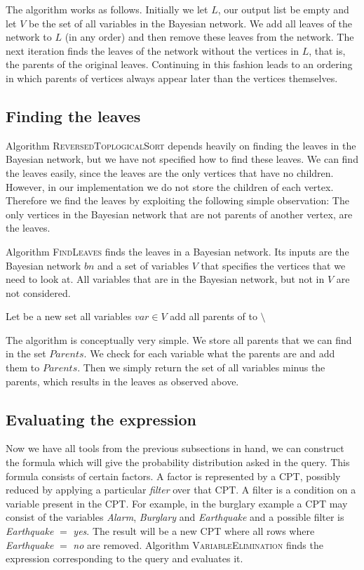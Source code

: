 \documentclass[10pt,a4paper]{article}
\begin{document}
The algorithm works as follows. Initially we let $L$, our output list be empty and let $V$ be the set of all variables in the Bayesian network. We add all leaves of the network to $L$ (in any order) and then remove these leaves from the network. The next iteration finds the leaves of the network without the vertices in $L$, that is, the parents of the original leaves. Continuing in this fashion leads to an ordering in which parents of vertices always appear later than the vertices themselves.

\subsection{Finding the leaves}
Algorithm \textsc{ReversedToplogicalSort} depends heavily on finding the leaves in the Bayesian network, but we have not specified how to find these leaves. We can find the leaves easily, since the leaves are the only vertices that have no children. However, in our implementation we do not store the children of each vertex. Therefore we find the leaves by exploiting the following simple observation: The only vertices in the Bayesian network that are not parents of another vertex, are the leaves. 

Algorithm \textsc{FindLeaves} finds the leaves in a Bayesian network. Its inputs are the Bayesian network $bn$ and a set of variables $V$ that specifies the vertices that we need to look at. All variables that are in the Bayesian network, but not in $V$ are not considered.

\begin{codebox}
\li Let  be a new set
\li \For all variables $var \in V$ \Do 
\li	add all parents of  to 
\End
\li \Return {} $\setminus$ 
\end{codebox}

The algorithm is conceptually very simple. We store all parents that we can find in the set $Parents$. We check for each variable what the parents are and add them to $Parents$. Then we simply return the set of all variables minus the parents, which results in the leaves as observed above.

\subsection{Evaluating the expression}
Now we have all tools from the previous subsections in hand, we can construct the formula which will give the probability distribution asked in the query. This formula consists of certain factors. A factor is represented by a CPT, possibly reduced by applying a particular \emph{filter} over that CPT. A filter is a condition on a variable present in the CPT. For example, in the burglary example a CPT may consist of the variables \emph{Alarm}, \emph{Burglary} and \emph{Earthquake} and a possible filter is \emph{Earthquake} $=$ \emph{yes}. The result will be a new CPT where all rows where \emph{Earthquake} $=$ \emph{no} are removed.
Algorithm \textsc{VariableElimination} finds the expression corresponding to the query and evaluates it.
\end{document}
